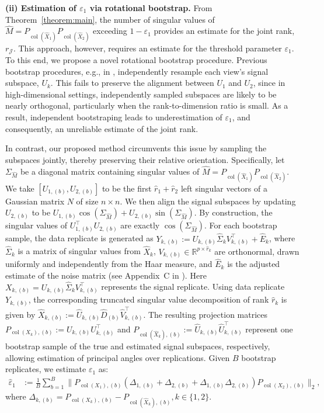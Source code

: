 \documentclass{amsart}
\DeclareMathOperator*{\col}{col}
\newcommand{\Jcal}{\mathcal{J}}
\begin{document}
\textbf{(ii) Estimation of $\varepsilon_1$ via rotational bootstrap.} \label{subsubsec:bootstrap}{
From Theorem~\ref{theorem:main}, the number of singular values of $\widehat{M} = P_{\col(\widehat{X}_1)} P_{\col(\widehat{X}_2)}$ exceeding $1-\varepsilon_1$ provides an estimate for the joint rank, $r_{\Jcal}$. This approach, however, requires an estimate for the threshold parameter $\varepsilon_1$. To this end, we propose a novel rotational bootstrap procedure. Previous bootstrap procedures, e.g., in \citet{prothero2024data}, independently resample each view's signal subspace, $U_k$. This fails to preserve the alignment between $U_1$ and $U_2$, since in high-dimensional settings, independently sampled subspaces are likely to be nearly orthogonal, particularly when the rank-to-dimension ratio is small. As a result, independent bootstraping leads to underestimation of $\varepsilon_1$, and consequently, an unreliable estimate of the joint rank. 
}


{ In contrast, our proposed method circumvents this issue by sampling the subspaces jointly, thereby preserving their relative orientation. Specifically, let $\Sigma_{\widehat{M}}$ be a diagonal matrix containing singular values of $\widehat M = P_{\col(\widehat X_1)}P_{\col(\widehat X_2)}$. We take $[U_{1,(b)}, U_{2,(b)}]$ to be the first $\widehat{r}_1 + \widehat{r}_2 $ left singular vectors of a Gaussian matrix $N$ of size $n \times n $.} We then align the signal subspaces by updating $U_{2,(b)}$ to be $U_{1,(b)} \cos (\Sigma_{\widehat{M}}) + U_{2,(b)} \sin (\Sigma_{\widehat{M}})$. By construction, the singular values of $U_{1,(b)}^\top U_{2,(b)}$ are exactly $\cos (\Sigma_{\widehat{M}})$. For each bootstrap sample, the data replicate is generated as $Y_{k,(b)} := U_{k,(b)} \widehat \Sigma_k V^\top_{k,(b)}  + \widehat{E}_k$, where $\widehat \Sigma_k$ is a matrix of singular values from $\widehat X_k$, { $V_{k,(b)} \in \mathbb{R}^{p \times \widehat{r}_k}$ are orthonormal, drawn uniformly and independently from the Haar measure}, and $\widehat E_k$ is the adjusted estimate of the noise matrix (see Appendix~C in \citet{prothero2024data}). Here $X_{k, (b)} = U_{k,(b)} \widehat \Sigma_k V^\top_{k,(b)}$ represents the signal replicate. Using data replicate $Y_{k,(b)}$, the corresponding truncated singular value decomposition of rank $\widehat r_k$ is given by $\widehat{X}_{k,(b)} := \widehat{U}_{k,(b)} \widehat D_{(b)} \widehat V_{k,(b)}^\top$. The resulting projection matrices $P_{\col(X_k),(b)} := U_{k,(b)} U^\top_{k,(b)}$ and $P_{\col(\widehat{X}_k),(b)} :=  \widehat{U}_{k,(b)}  \widehat{U}^\top_{k,(b)}$ represent one bootstrap sample of the true and estimated signal subspaces, respectively, allowing estimation of principal angles over replications. Given $B$ bootstrap replicates, we estimate $\varepsilon_1$ as:
\begin{eqnarray}
\widehat{\varepsilon}_1 &:= \frac{1}{B}\sum_{b = 1}^B \|P_{\col(X_1),(b)}(\Delta_{1,(b)}+\Delta_{2,(b)}+\Delta_{1,(b)}\Delta_{2,(b)})P_{\col(X_2),(b)}\|_2,
\label{eqn:epsilon_estimates}
\end{eqnarray}
where $\Delta_{k,(b)} = P_{\col(X_k),(b)}-P_{\col(\widehat{X}_k),(b)}, k \in \{1,2\}$. 
\end{document}
